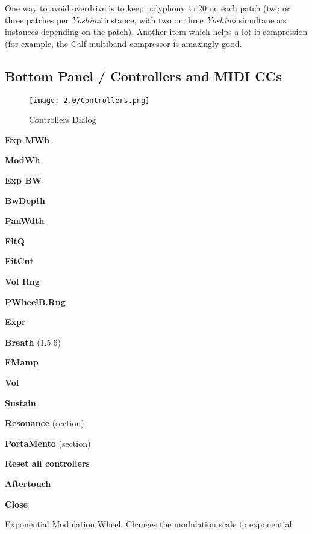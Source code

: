    One way to avoid overdrive is to keep polyphony to 20 on each patch (two
   or three patches per \textsl{Yoshimi} instance, with two or three
   \textsl{Yoshimi} simultaneous instances depending on the patch).
   Another item which helps a lot is compression (for example, the Calf
   multiband compressor is amazingly good.

\subsection{Bottom Panel / Controllers and MIDI CCs}
\label{subsec:bottom_panel_controllers}

\begin{figure}[H]
   \centering
   \texttt{[image: 2.0/Controllers.png]}
   \caption{Controllers Dialog}
   \label{fig:controllers_dialog}
\end{figure}

   \begin{enumber}
      \item \textbf{Exp MWh}
      \item \textbf{ModWh}
      \item \textbf{Exp BW}
      \item \textbf{BwDepth}
      \item \textbf{PanWdth}
      \item \textbf{FltQ}
      \item \textbf{FitCut}
      \item \textbf{Vol Rng}
      \item \textbf{PWheelB.Rng}
      \item \textbf{Expr}
      \item \textbf{Breath} (1.5.6)
      \item \textbf{FMamp}
      \item \textbf{Vol}
      \item \textbf{Sustain}
      \item \textbf{Resonance} (section)
      \item \textbf{PortaMento} (section)
      \item \textbf{Reset all controllers}
      \item \textbf{Aftertouch}
      \item \textbf{Close}
   \end{enumber}

   \setcounter{ItemCounter}{0}      %

   Exponential Modulation Wheel.
   Changes the modulation scale to exponential.

